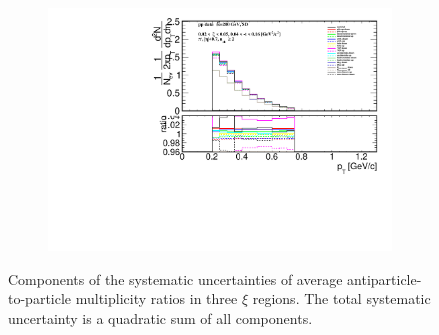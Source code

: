 \begin{figure}[h!]
\begin{subfigure}{.49\textwidth}
		\end{subfigure}
		\begin{subfigure}{.49\textwidth}
			\includegraphics[width=\textwidth,page=39]{chapters/chrgSTAR/img/syst/outPID_SDT_ratio.pdf}
		\end{subfigure}
		\begin{minipage}{.49\textwidth}
			\caption[Components of the systematic uncertainties of average antiparticle-to-particle multiplicity ratios  in three $\xi$ regions]{Components of the systematic uncertainties of average antiparticle-to-particle multiplicity ratios  in three $\xi$ regions. The total  systematic uncertainty is a quadratic sum of all  components.}
			\label{fig:results_star_syst_xi_part}
		\end{minipage}
\end{figure}

\captionsetup{format=default,indention=0pt,justification=justified}
\FloatBarrier